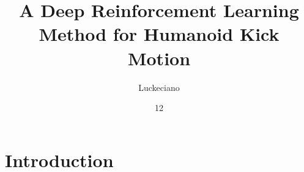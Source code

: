 \documentclass[tg, eng]{ita}    %
\author{Luckeciano}{Carvalho Melo}
\title{A Deep Reinforcement Learning Method for Humanoid Kick Motion}
\date{12}{JUNE}{2018}
\begin{document}
\maketitle
%
%

 

%


%

\begin{englishabstract}
\noindent

\end{englishabstract}

\listoffigures %

\listoftables %

\listofabbreviations

\listofsymbols

\tableofcontents

\mainmatter

\chapter{Introduction}\label{ch:intro}

\end{document}
